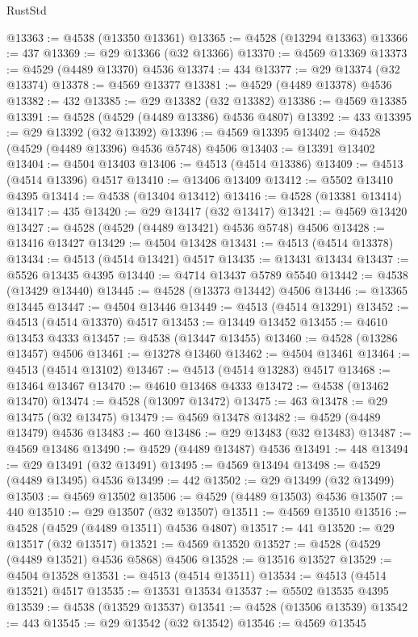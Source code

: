 \begin{lexlean}{RustStd}
\begin{coremodule}
@13363 := @4538 (@13350 @13361)
@13365 := @4528 (@13294 @13363)
@13366 := 437
@13369 := @29 @13366 (@32 @13366)
@13370 := @4569 @13369
@13373 := @4529 (@4489 @13370) @4536
@13374 := 434
@13377 := @29 @13374 (@32 @13374)
@13378 := @4569 @13377
@13381 := @4529 (@4489 @13378) @4536
@13382 := 432
@13385 := @29 @13382 (@32 @13382)
@13386 := @4569 @13385
@13391 := @4528 (@4529 (@4489 @13386) @4536 @4807)
@13392 := 433
@13395 := @29 @13392 (@32 @13392)
@13396 := @4569 @13395
@13402 := @4528 (@4529 (@4489 @13396) @4536 @5748) @4506
@13403 := @13391 @13402
@13404 := @4504 @13403
@13406 := @4513 (@4514 @13386)
@13409 := @4513 (@4514 @13396) @4517
@13410 := @13406 @13409
@13412 := @5502 @13410 @4395
@13414 := @4538 (@13404 @13412)
@13416 := @4528 (@13381 @13414)
@13417 := 435
@13420 := @29 @13417 (@32 @13417)
@13421 := @4569 @13420
@13427 := @4528 (@4529 (@4489 @13421) @4536 @5748) @4506
@13428 := @13416 @13427
@13429 := @4504 @13428
@13431 := @4513 (@4514 @13378)
@13434 := @4513 (@4514 @13421) @4517
@13435 := @13431 @13434
@13437 := @5526 @13435 @4395
@13440 := @4714 @13437 @5789 @5540
@13442 := @4538 (@13429 @13440)
@13445 := @4528 (@13373 @13442) @4506
@13446 := @13365 @13445
@13447 := @4504 @13446
@13449 := @4513 (@4514 @13291)
@13452 := @4513 (@4514 @13370) @4517
@13453 := @13449 @13452
@13455 := @4610 @13453 @4333
@13457 := @4538 (@13447 @13455)
@13460 := @4528 (@13286 @13457) @4506
@13461 := @13278 @13460
@13462 := @4504 @13461
@13464 := @4513 (@4514 @13102)
@13467 := @4513 (@4514 @13283) @4517
@13468 := @13464 @13467
@13470 := @4610 @13468 @4333
@13472 := @4538 (@13462 @13470)
@13474 := @4528 (@13097 @13472)
@13475 := 463
@13478 := @29 @13475 (@32 @13475)
@13479 := @4569 @13478
@13482 := @4529 (@4489 @13479) @4536
@13483 := 460
@13486 := @29 @13483 (@32 @13483)
@13487 := @4569 @13486
@13490 := @4529 (@4489 @13487) @4536
@13491 := 448
@13494 := @29 @13491 (@32 @13491)
@13495 := @4569 @13494
@13498 := @4529 (@4489 @13495) @4536
@13499 := 442
@13502 := @29 @13499 (@32 @13499)
@13503 := @4569 @13502
@13506 := @4529 (@4489 @13503) @4536
@13507 := 440
@13510 := @29 @13507 (@32 @13507)
@13511 := @4569 @13510
@13516 := @4528 (@4529 (@4489 @13511) @4536 @4807)
@13517 := 441
@13520 := @29 @13517 (@32 @13517)
@13521 := @4569 @13520
@13527 := @4528 (@4529 (@4489 @13521) @4536 @5868) @4506
@13528 := @13516 @13527
@13529 := @4504 @13528
@13531 := @4513 (@4514 @13511)
@13534 := @4513 (@4514 @13521) @4517
@13535 := @13531 @13534
@13537 := @5502 @13535 @4395
@13539 := @4538 (@13529 @13537)
@13541 := @4528 (@13506 @13539)
@13542 := 443
@13545 := @29 @13542 (@32 @13542)
@13546 := @4569 @13545

\end{coremodule}
\end{lexlean}
